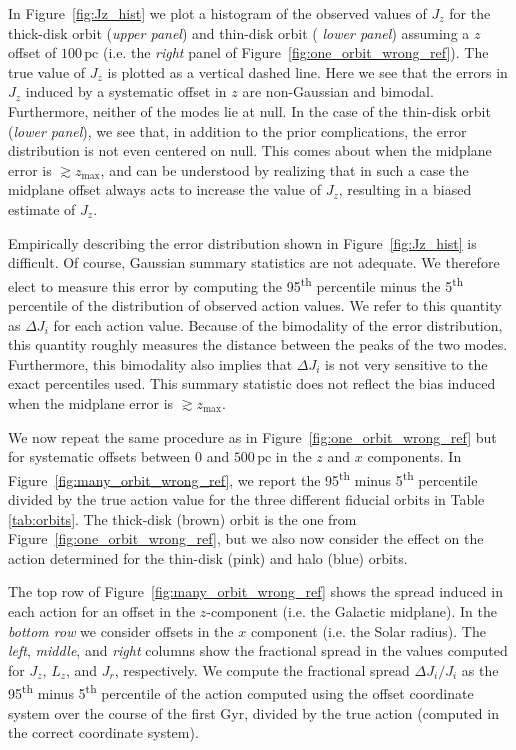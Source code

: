 \documentclass[twocolumn]{aastex62}
\newcommand{\pc}{\text{pc}}
\newcommand{\Gyr}{\text{Gyr}}
\newcommand{\uth}{\textsuperscript{th}}
\newcommand{\thincolor}{pink}
\newcommand{\thickcolor}{brown}
\newcommand{\halocolor}{blue}
\begin{document}
In Figure~\ref{fig:Jz_hist} we plot a histogram of the observed values of
$J_z$ for the thick-disk orbit ({\em upper panel}) and thin-disk orbit ({\em
lower panel}) assuming a $z$ offset of $100\,\pc$ (i.e. the {\em right} panel
of Figure~\ref{fig:one_orbit_wrong_ref}). The true value of $J_z$ is plotted
as a vertical dashed line. Here we see that the 
    errors 
in $J_z$ induced by a
systematic offset in $z$ are non-Gaussian and bimodal. Furthermore, neither of
the modes lie %
   at null. 
In the case of the thin-disk orbit
({\em lower panel}), we see that, in addition to the prior complications, the
error distribution is not even centered on 
    null. 
This comes about
when the midplane error is $\gtrsim z_{\text{max}}$, and can be understood by
realizing that in such a case the midplane offset always acts to increase the
value of $J_z$, resulting in a biased estimate of $J_z$.

Empirically describing the error distribution shown in
Figure~\ref{fig:Jz_hist} is difficult. Of course, Gaussian summary statistics
are not adequate. We therefore elect to measure this error by computing the
95\uth{} percentile minus the 5\uth{} percentile of the distribution of
observed action values. We refer to this quantity as $\Delta J_i$ for each
action value. Because of the bimodality of the error distribution, this
quantity roughly measures the distance between the peaks of the two modes.
Furthermore, this bimodality also implies that $\Delta J_i$ is not very
sensitive to the exact percentiles used. This summary statistic does not
reflect the bias induced when the midplane error is $\gtrsim z_{\text{max}}$.

We now repeat the same procedure as in Figure~\ref{fig:one_orbit_wrong_ref}
but for systematic offsets between $0$ and $500\,\pc$ in the $z$ and $x$
components. In Figure~\ref{fig:many_orbit_wrong_ref}, we report the 95\uth{}
minus 5\uth{} percentile divided by the true action value for the three
different fiducial orbits in Table \ref{tab:orbits}. The thick-disk
(\thickcolor) orbit is the one from Figure~\ref{fig:one_orbit_wrong_ref}, but
we also now consider the effect on the action determined for the thin-disk
(\thincolor) and halo (\halocolor) orbits.

The top row of Figure~\ref{fig:many_orbit_wrong_ref} shows the spread induced
in each action for an offset in the $z$-component (i.e. the Galactic
midplane). In the {\em bottom row} we consider offsets in the $x$ component
(i.e. the Solar radius). The {\em left}, {\em middle}, and {\em right} columns
show the fractional spread in the values computed for $J_z$, $L_z$, and $J_r$,
respectively. We compute the fractional spread $\Delta J_i/J_i$ as the 95\uth{}
minus 5\uth{} percentile of the action computed using the offset coordinate
system over the course of the first $\Gyr$, divided by the true action
(computed in the correct coordinate system).
\end{document}
